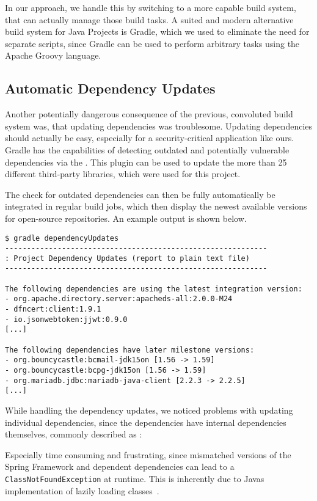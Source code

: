 In our approach, we handle this by switching to a more capable build system, that can actually manage those build tasks.
A suited and modern alternative build system for Java Projects is Gradle, which we used to eliminate the need for
separate scripts, since Gradle can be used to perform arbitrary tasks using the Apache Groovy language.

\subsection*{Automatic Dependency Updates}
Another potentially dangerous consequence of the previous, convoluted build system was, that updating dependencies was
troublesome.
Updating dependencies should actually be easy, especially for a security-critical application like ours.
Gradle has the capabilities of detecting outdated and potentially vulnerable dependencies via the
.
This plugin can be used to update the more than 25 different third-party libraries, which were used for this project.

The check for outdated dependencies can then be fully automatically be integrated in regular build jobs, which then
display the newest available versions for open-source repositories.
An example output is shown below.

\begin{lstlisting}
$ gradle dependencyUpdates
------------------------------------------------------------
: Project Dependency Updates (report to plain text file)
------------------------------------------------------------

The following dependencies are using the latest integration version:
- org.apache.directory.server:apacheds-all:2.0.0-M24
- dfncert:client:1.9.1
- io.jsonwebtoken:jjwt:0.9.0
[...]

The following dependencies have later milestone versions:
- org.bouncycastle:bcmail-jdk15on [1.56 -> 1.59]
- org.bouncycastle:bcpg-jdk15on [1.56 -> 1.59]
- org.mariadb.jdbc:mariadb-java-client [2.2.3 -> 2.2.5]
[...]
\end{lstlisting}

While handling the dependency updates, we noticed problems with updating individual dependencies, since the dependencies
have internal dependencies themselves, commonly described as : %

Especially time consuming and frustrating, since mismatched versions of the Spring Framework and dependent dependencies
can lead to a \lstinline{ClassNotFoundException} at runtime.
This is inherently due to Javas implementation of lazily loading classes~\cite{gosling2014java}.

